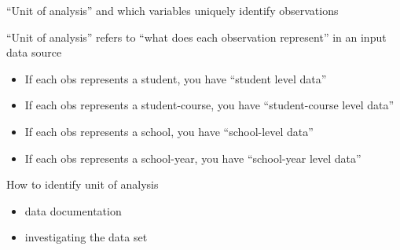 \documentclass[8pt,ignorenonframetext,dvipsnames]{beamer}
\providecommand{\tightlist}{%
  \setlength{\itemsep}{0pt}\setlength{\parskip}{0pt}}
\let\olditem\item
\renewcommand{\item}{%
  \olditem\vspace{4pt}
}
\begin{document}
\begin{frame}{``Unit of analysis'' and which variables uniquely identify
observations}

``Unit of analysis'' refers to ``what does each observation represent''
in an input data source

\begin{itemize}
\tightlist
\item
  If each obs represents a student, you have ``student level data''
\item
  If each obs represents a student-course, you have ``student-course
  level data''
\item
  If each obs represents a school, you have ``school-level data''
\item
  If each obs represents a school-year, you have ``school-year level
  data''
\end{itemize}

How to identify unit of analysis

\begin{itemize}
\tightlist
\item
  data documentation
\item
  investigating the data set
\end{itemize}

\end{frame}
\end{document}
